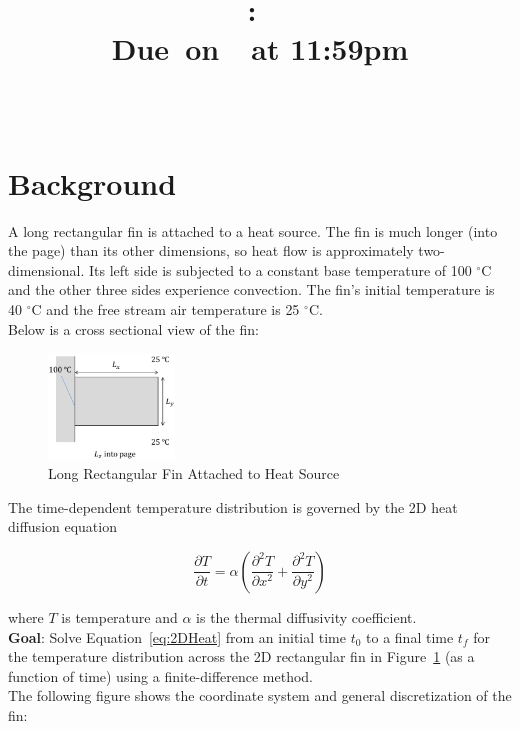 \documentclass{article}
\title{
    \vspace{2in}
    \textmd{\textbf{\hmwkClass:\ \hmwkTitle}}\\
    \normalsize\vspace{0.1in}\small{Due\ on\ \hmwkDueDate\ at 11:59pm}\\
    \vspace{0.1in}\large{\textit{\hmwkClassInstructor\ \hmwkClassTime}}
    \vspace{3in}
}
\author{\hmwkAuthorName}
\date{}
\newcommand{\pderiv}[2]{\displaystyle \frac{\partial #1}{\partial #2}}
\begin{document}
\maketitle

\pagebreak

\section{Background}
A long rectangular fin is attached to a heat source. The fin is much longer (into the page) than its other
dimensions, so heat flow is approximately two-dimensional. Its left side is subjected to a constant base
temperature of 100 ${}^{\circ}$C and the other three sides experience convection. The fin's initial temperature is\\
40 ${}^{\circ}$C and the free stream air temperature is 25 ${}^{\circ}$C. \\

Below is a cross sectional view of the fin:

\begin{figure}[h]
    \centering
    \includegraphics[width=0.3\textwidth]{fig/fin.png}
    \caption{Long Rectangular Fin Attached to Heat Source}
    \label{fig:fin}
\end{figure}

The time-dependent temperature distribution is governed by the 2D heat diffusion equation

\begin{equation}
    \pderiv{T}{t} = \alpha \left( \pderiv{^2 T}{x^2} + \pderiv{^2 T}{y^2}\right)
    \label{eq:2DHeat}
\end{equation}

where $T$ is temperature and $\alpha$ is the thermal diffusivity coefficient.\\

\textbf{Goal}: Solve Equation~\eqref{eq:2DHeat} from an initial time $t_0$ to a final time $t_f$ for the temperature distribution across the 2D rectangular fin in Figure~\ref{fig:fin} (as a function of time) using a finite-difference method.\\

The following figure shows the coordinate system and general discretization of the fin:
\end{document}
